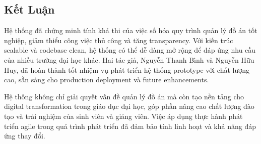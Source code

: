 \documentclass[conference,a4paper]{IEEEtran}
\begin{document}
\subsection{Kết Luận}
Hệ thống đã chứng minh tính khả thi của việc số hóa quy trình quản lý đồ án tốt nghiệp, giảm thiểu công việc thủ công và tăng transparency. Với kiến trúc scalable và codebase clean, hệ thống có thể dễ dàng mở rộng để đáp ứng nhu cầu của nhiều trường đại học khác. Hai tác giả, Nguyễn Thanh Bình và Nguyễn Hữu Huy, đã hoàn thành tốt nhiệm vụ phát triển hệ thống prototype với chất lượng cao, sẵn sàng cho production deployment và future enhancements.

Hệ thống không chỉ giải quyết vấn đề quản lý đồ án mà còn tạo nền tảng cho digital transformation trong giáo dục đại học, góp phần nâng cao chất lượng đào tạo và trải nghiệm của sinh viên và giảng viên. Việc áp dụng thực hành phát triển agile \cite{anderson2017agile} trong quá trình phát triển đã đảm bảo tính linh hoạt và khả năng đáp ứng thay đổi.


\end{document}
